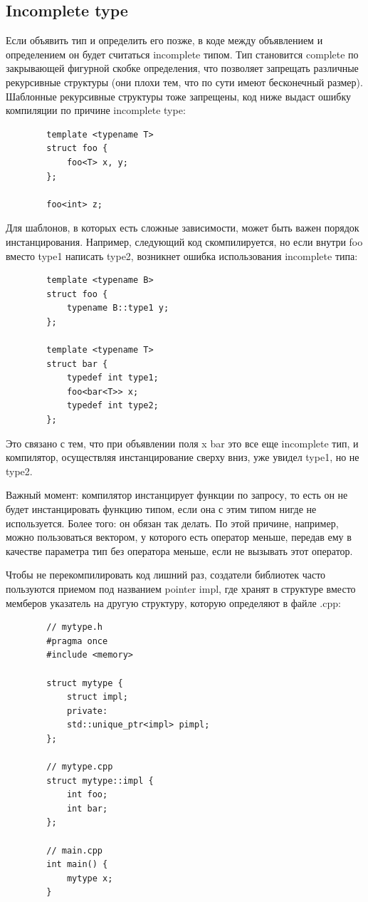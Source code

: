\documentclass[12pt, a4paper]{article}
\begin{document}
	\subsection{Incomplete type}
	\par Если объявить тип и определить его позже, в коде между объявлением и определением он будет считаться incomplete типом. Тип становится complete по закрывающей фигурной скобке определения, что позволяет запрещать различные рекурсивные структуры (они плохи тем, что по сути имеют бесконечный размер). Шаблонные рекурсивные структуры тоже запрещены, код ниже выдаст ошибку компиляции по причине incomplete type:
	\begin{verbatim}
		template <typename T>
		struct foo {
			foo<T> x, y;
		};
		
		foo<int> z;
	\end{verbatim}
	\par Для шаблонов, в которых есть сложные зависимости, может быть важен порядок инстанцирования. Например, следующий код скомпилируется, но если внутри foo вместо type1 написать type2, возникнет ошибка использования incomplete типа:
	\begin{verbatim}
		template <typename B>
		struct foo {
			typename B::type1 y;
		};
		
		template <typename T>
		struct bar {
			typedef int type1;
			foo<bar<T>> x;
			typedef int type2;
		};
	\end{verbatim}
	Это связано с тем, что при объявлении поля x bar это все еще incomplete тип, и компилятор, осуществляя инстанцирование сверху вниз, уже увидел type1, но не type2.
	\\\par Важный момент: компилятор инстанцирует функции по запросу, то есть он не будет инстанцировать функцию типом, если она с этим типом нигде не используется. Более того: он обязан так делать. По этой причине, например, можно пользоваться вектором, у которого есть оператор меньше, передав ему в качестве параметра тип без оператора меньше, если не вызывать этот оператор.
	\\\par Чтобы не перекомпилировать код лишний раз, создатели библиотек часто пользуются приемом под названием pointer impl, где хранят в структуре вместо мемберов указатель на другую структуру, которую определяют в файле .cpp:
	\begin{verbatim}
		// mytype.h
		#pragma once
		#include <memory>
		
		struct mytype {
			struct impl;
			private:
			std::unique_ptr<impl> pimpl;
		};
		
		// mytype.cpp
		struct mytype::impl {
			int foo;
			int bar;
		};
		
		// main.cpp
		int main() {
			mytype x;
		}
	\end{verbatim}
\end{document}
